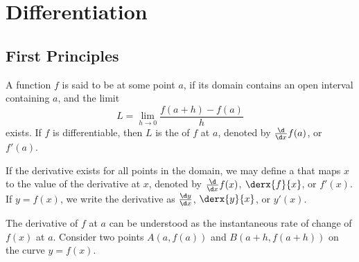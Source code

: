 \chapter{Differentiation}

\section{First Principles}

\begin{definition}\label{def:derivative}
    A function $f$ is said to be  at some point $a$, if its domain contains an open interval containing $a$, and the limit \[L = \lim_{h \to 0} \frac{f(a+h) - f(a)}{h}\] exists. If $f$ is differentiable, then $L$ is the  of $f$ at $a$, denoted by $\frac{\d}{\d x} f(a)$, or $f'(a)$.
    
    If the derivative exists for all points in the domain, we may define a  that maps $x$ to the value of the derivative at $x$, denoted by $\frac{\d}{\d x} f(x)$, $\derx{f}{x}$, or $f'(x)$. If $y = f(x)$, we write the derivative as $\frac{\d y}{\d x}$, $\derx{y}{x}$, or $y'(x)$.
\end{definition}


The derivative of $f$ at $a$ can be understood as the instantaneous rate of change of $f(x)$ at $a$. Consider two points $A(a, f(a))$ and $B(a + h, f(a + h))$ on the curve $y = f(x)$.

\begin{figure}[H]
    \centering
    \caption{}
\end{figure}


